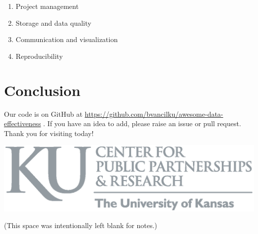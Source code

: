 \documentclass[a0paper,fleqn]{betterposter-latex-template/betterposter}
\begin{document}
{\begin{enumerate}
    \item Project management
    \item Storage and data quality
    \item Communication and visualization
    \item Reproducibility
\end{enumerate}

\section{Conclusion}

Our code is on GitHub at \url{https://github.com/bvancilku/awesome-data-effectiveness} . If you have an idea to add, please raise an issue or pull request. Thank you for visiting today!

\vfill

\includegraphics[width=\textwidth]{img/cppr-gray-01.eps}\\

}{

(This space was intentionally left blank for notes.)
}
\end{document}
